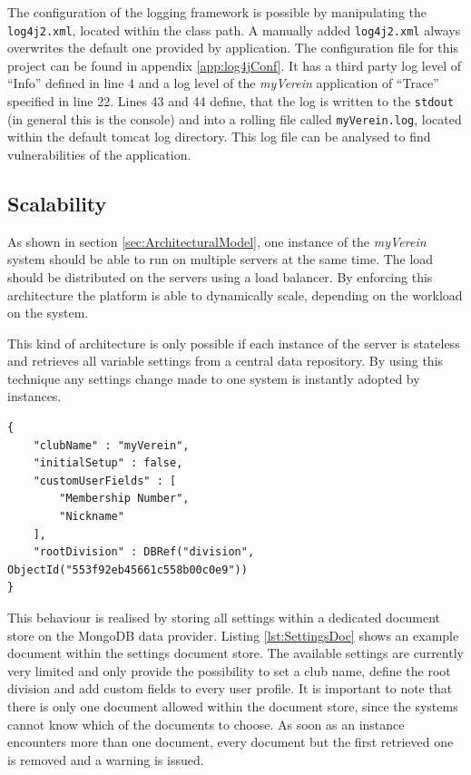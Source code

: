 The configuration of the logging framework is possible by manipulating the \texttt{log4j2.xml}, located within the class path. A manually added \texttt{log4j2.xml} always overwrites the default one provided by application. The configuration file for this project can be found in appendix \vref{app:log4jConf}. It has a third party log level of \enquote{Info} defined in line 4 and a log level of the \emph{myVerein} application of \enquote{Trace} specified in line 22. Lines 43 and 44 define, that the log is written to the \texttt{stdout} (in general this is the console) and into a rolling file called \texttt{myVerein.log}, located within the default tomcat log directory. This log file can be analysed to find vulnerabilities of the application.

\subsection{Scalability}
\label{sec:Scalability}

As shown in section \vref{sec:ArchitecturalModel}, one instance of the \emph{myVerein} system should be able to run on multiple servers at the same time. The load should be distributed on the servers using a load balancer. By enforcing this architecture the platform is able to dynamically scale, depending on the workload on the system.

This kind of architecture is only possible if each instance of the server is stateless and retrieves all variable settings from a central data repository. By using this technique any settings change made to one system is instantly adopted by instances. 

\begin{lstlisting}[caption ={Example layout of settings document}, label=lst:SettingsDoc]
{
	"clubName" : "myVerein", 
	"initialSetup" : false, 
	"customUserFields" : [
		"Membership Number",
		"Nickname"
	],
	"rootDivision" : DBRef("division", ObjectId("553f92eb45661c558b00c0e9")) 
}
\end{lstlisting}

This behaviour is realised by storing all settings within a dedicated document store on the MongoDB data provider. Listing \vref{lst:SettingsDoc} shows an example document within the settings document store. The available settings are currently very limited and only provide the possibility to set a club name, define the root division and add custom fields to every user profile. It is important to note that there is only one document allowed within the document store, since the systems cannot know which of the documents to choose. As soon as an instance encounters more than one document, every document but the first retrieved one is removed and a warning is issued. 

